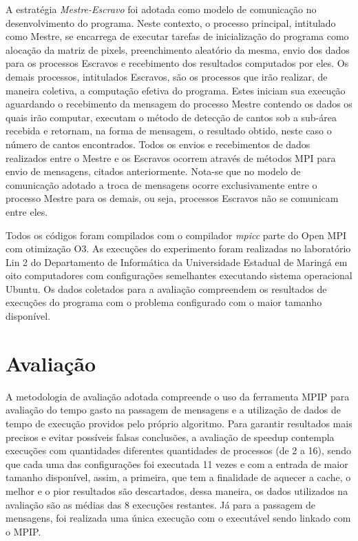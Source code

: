 \documentclass[12pt]{article}
\begin{document}
 A estratégia \textit{Mestre-Escravo} foi adotada como modelo de comunicação no desenvolvimento do programa. Neste contexto, o processo principal, intitulado como Mestre, se encarrega de executar tarefas de inicialização do programa como alocação da matriz de pixels, preenchimento aleatório da mesma, envio dos dados para os processos Escravos e recebimento dos resultados computados por eles. Os demais processos, intitulados Escravos, são os processos que irão realizar, de maneira coletiva, a computação efetiva do programa. Estes iniciam sua execução aguardando o recebimento da mensagem do processo Mestre contendo os dados os quais irão computar, executam o método de detecção de cantos sob a sub-área recebida e retornam, na forma de mensagem, o resultado obtido, neste caso o número de cantos encontrados. Todos os envios e recebimentos de dados realizados entre o Mestre e os Escravos ocorrem através de métodos MPI para envio de mensagens, citados anteriormente. Nota-se que no modelo de comunicação adotado a troca de mensagens ocorre exclusivamente entre o processo Mestre para os demais, ou seja, processos Escravos não se comunicam entre eles.

Todos os códigos foram compilados com o compilador \textit{mpicc} parte do Open MPI com otimização O3. As execuções do experimento foram realizadas no laboratório Lin 2 do Departamento de Informática da Universidade Estadual de Maringá em oito computadores com configurações semelhantes executando sistema operacional Ubuntu. Os dados coletados para a avaliação compreendem os resultados de execuções do programa com o problema configurado com o maior tamanho disponível.

\section{Avaliação}

A metodologia de avaliação adotada compreende o uso da ferramenta MPIP para avaliação do tempo gasto na passagem de mensagens e a utilização de dados de tempo de execução providos pelo próprio algoritmo. Para garantir resultados mais precisos e evitar possíveis falsas conclusões, a avaliação de speedup contempla execuções com quantidades diferentes quantidades de processos (de 2 a 16), sendo que cada uma das configurações foi executada 11 vezes e com a entrada de maior tamanho disponível, assim, a primeira, que tem a finalidade de aquecer a cache, o melhor e o pior resultados são descartados, dessa maneira, os dados utilizados na avaliação são as médias das 8 execuções restantes. Já para a passagem de mensagens, foi realizada uma única execução com o executável sendo linkado com o MPIP.
\end{document}
